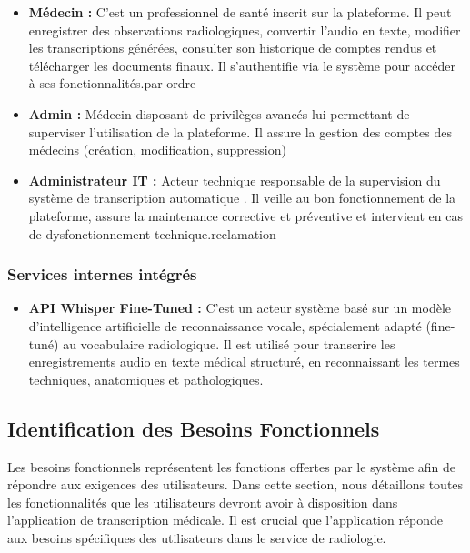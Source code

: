 \documentclass[12pt,a4paper]{report}
\begin{document}
\begin{itemize}
    \item \textbf{Médecin :} C'est un professionnel de santé inscrit sur la plateforme. Il peut enregistrer des observations radiologiques, convertir l'audio en texte, modifier les transcriptions générées, consulter son historique de comptes rendus et télécharger les documents finaux. Il s'authentifie via le système pour accéder à ses fonctionnalités.par ordre

    \item \textbf {Admin :}
   Médecin disposant de privilèges avancés lui permettant de superviser l'utilisation de la plateforme. Il assure la gestion des comptes des médecins (création, modification, suppression)

   \item \textbf{Administrateur IT :} Acteur technique responsable de la supervision du système de transcription automatique . Il veille au bon fonctionnement de la plateforme, assure la maintenance corrective et préventive et intervient en cas de dysfonctionnement technique.reclamation


\end{itemize}

\subsubsection{Services internes intégrés}
\begin{itemize}
\item \textbf{API Whisper Fine-Tuned :} C'est un acteur système basé sur un modèle d'intelligence artificielle de reconnaissance vocale, spécialement adapté (fine-tuné) au vocabulaire radiologique. Il est utilisé pour transcrire les enregistrements audio en texte médical structuré, en reconnaissant les termes techniques, anatomiques et pathologiques.
\end{itemize}



\subsection{Identification des Besoins Fonctionnels}
Les besoins fonctionnels représentent les fonctions offertes par le système afin de répondre aux exigences des utilisateurs. Dans cette section, nous détaillons toutes les fonctionnalités que les utilisateurs devront avoir à disposition dans l'application de transcription médicale. Il est crucial que l'application réponde aux besoins spécifiques des utilisateurs dans le service de radiologie.
\end{document}
